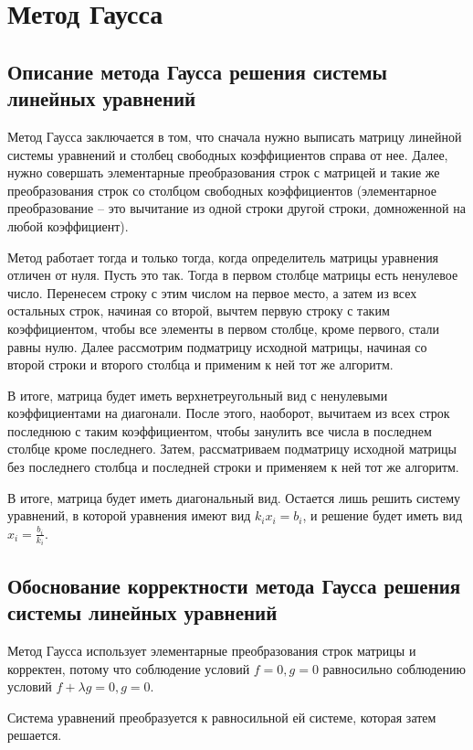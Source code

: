 \documentclass{article}
\theoremstyle{definition}
\theoremstyle{remark}
\newcommand{\lfrac} [2] {\displaystyle \frac{#1}{#2}}
\begin{document}
\section{Метод Гаусса}

\subsection{Описание метода Гаусса решения системы линейных уравнений}
Метод Гаусса заключается в том, что сначала нужно выписать матрицу линейной системы уравнений и столбец свободных коэффициентов справа от нее. Далее, нужно совершать элементарные преобразования строк с матрицей и такие же преобразования строк со столбцом свободных коэффициентов (элементарное преобразование -- это вычитание из одной строки другой строки, домноженной на любой коэффициент).

Метод работает тогда и только тогда, когда определитель матрицы уравнения отличен от нуля. Пусть это так. Тогда в первом столбце матрицы есть ненулевое число. Перенесем строку с этим числом на первое место, а затем из всех остальных строк, начиная со второй, вычтем первую строку с таким коэффициентом, чтобы все элементы в первом столбце, кроме первого, стали равны нулю. Далее рассмотрим подматрицу исходной матрицы, начиная со второй строки и второго столбца и применим к ней тот же алгоритм.

В итоге, матрица будет иметь верхнетреугольный вид с ненулевыми коэффициентами на диагонали. После этого, наоборот, вычитаем из всех строк последнюю с таким коэффициентом, чтобы занулить все числа в последнем столбце кроме последнего. Затем, рассматриваем подматрицу исходной матрицы без последнего столбца и последней строки и применяем к ней тот же алгоритм.

В итоге, матрица будет иметь диагональный вид. Остается лишь решить систему уравнений, в которой уравнения имеют вид $k_i x_i = b_i$, и решение будет иметь вид $x_i = \lfrac{b_i}{k_i}$.

\subsection{Обоснование корректности метода Гаусса решения системы линейных уравнений}

Метод Гаусса использует элементарные преобразования строк матрицы и корректен, потому что соблюдение условий $f = 0, g = 0$ равносильно соблюдению условий $f + \lambda g = 0, g = 0$.

Система уравнений преобразуется к равносильной ей системе, которая затем решается.
\end{document}
